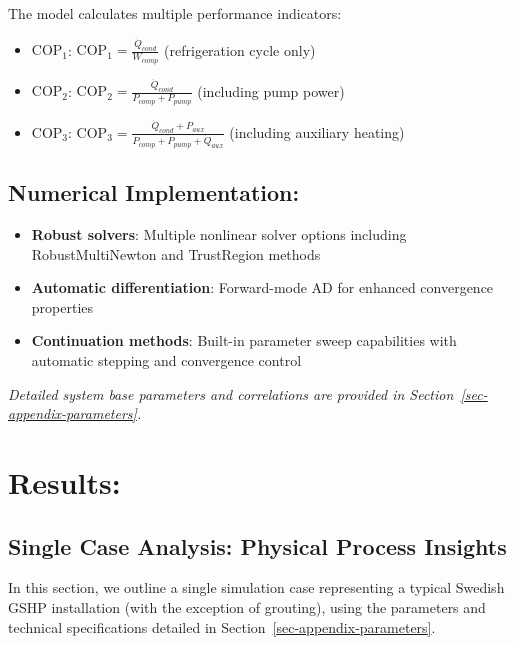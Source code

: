 \documentclass[journal=iecr,manuscript=]{achemso}
\begin{document}
The model calculates multiple performance indicators:

\begin{itemize}
\item
  \textbf{\(\text{COP}_1\)}:
  \(\text{COP}_1 = \frac{\dot{Q}_{cond}}{W_{comp}}\) (refrigeration
  cycle only)
\item
  \textbf{\(\text{COP}_2\)}:
  \(\text{COP}_2 = \frac{\dot{Q}_{cond}}{P_{comp} + P_{pump}}\)
  (including pump power)
\item
  \textbf{\(\text{COP}_3\)}:
  \(\text{COP}_3 = \frac{\dot{Q}_{cond} + P_{aux}}{P_{comp} + P_{pump} + \dot{Q}_{aux}}\)
  (including auxiliary heating)
\end{itemize}

\subsection{Numerical Implementation:}\label{numerical-implementation}

\begin{itemize}
\item
  \textbf{Robust solvers}: Multiple nonlinear solver options including
  RobustMultiNewton and TrustRegion methods
\item
  \textbf{Automatic differentiation}: Forward-mode AD for enhanced
  convergence properties
\item
  \textbf{Continuation methods}: Built-in parameter sweep capabilities
  with automatic stepping and convergence control
\end{itemize}

\emph{Detailed system base parameters and correlations are provided in
Section~\ref{sec-appendix-parameters}.}

\section{Results:}\label{results}

\subsection{Single Case Analysis: Physical Process
Insights}\label{single-case-analysis-physical-process-insights}

In this section, we outline a single simulation case representing a
typical Swedish GSHP installation (with the exception of grouting),
using the parameters and technical specifications detailed in
Section~\ref{sec-appendix-parameters}.
\end{document}
